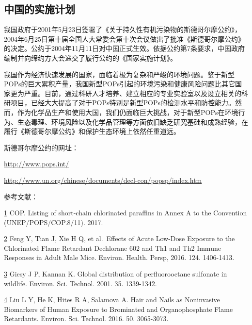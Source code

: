 \documentclass[]{book}
\begin{document}
\hypertarget{ux4e2dux56fdux7684ux5b9eux65bdux8ba1ux5212}{%
\subsection{中国的实施计划}\label{ux4e2dux56fdux7684ux5b9eux65bdux8ba1ux5212}}

我国政府于2001年5月23日签署了《关于持久性有机污染物的斯德哥尔摩公约》，2004年6月25日第十届全国人大常委会第十次会议做出了批准《斯德哥尔摩公约》的决定。公约于2004年11月11日对中国正式生效。依据公约第7条要求，中国政府编制并向缔约方大会递交了履行公约的《国家实施计划》。

我国作为经济快速发展的国家，面临着极为复杂和严峻的环境问题。鉴于新型POPs的巨大累积产量，我国新型POPs引起的环境污染和健康风险问题比其它国家更为严重。目前，通过科研人才培养、建立相应的专业实验室以及设立相关的科研项目，已经大大提高了对于POPs特别是新型POPs的检测水平和防控能力。然而，作为化学品生产和使用大国，我们仍面临巨大挑战，对于新型POPs在环境行为、生态毒理、环境风险以及化学品管理等方面依旧缺乏研究基础和成熟经验，在履行《斯德哥尔摩公约》和保护生态环境上依然任重道远。

斯德哥尔摩公约的网址：

\url{http://www.pops.int/}

\url{http://www.un.org/chinese/documents/decl-con/popsp/index.htm}

参考文献：

\href{陈心想，耿增超。西北农林科技大学学报（自然科学版），2013，41:\%20167-174．}{1} COP. Listing of short-chain chlorinated paraffins in Annex A to the Convention (UNEP/POPS/COP.8/11). 2017.

\href{Kezhen\%20Qian,\%20Ajay\%20Kumar,\%20et.al.\%20Renew.\%20and\%20Sustain.\%20Energy\%20Reviews,\%202015,\%2042:\%201055-1064.}{2} Feng Y, Tian J, Xie H Q, et al.~Effects of Acute Low-Dose Exposure to the Chlorinated Flame Retardant Dechlorane 602 and Th1 and Th2 Immune Responses in Adult Male Mice. Environ. Health. Persp, 2016. 124. 1406-1413.

\href{Puga\%20A\%20P,\%20Abreu\%20C\%20A,\%20et\%20al.\%20J.\%20of\%20Environ.\%20Manage.,\%202015,\%20159:\%2086–93.}{3} Giesy J P, Kannan K. Global distribution of perfluorooctane sulfonate in wildlife. Environ. Sci. Technol. 2001. 35. 1339-1342.

\href{Khan\%20S,\%20Cai\%20Chao,\%20et\%20al．\%20Environ.\%20Sci.\%20\&\%20Technol.,\%202013,\%2047\%20:\%208624-8632．}{4} Liu L Y, He K, Hites R A, Salamova A. Hair and Nails as Noninvasive Biomarkers of Human Exposure to Brominated and Organophosphate Flame Retardants. Environ. Sci. Technol. 2016. 50. 3065-3073.
\end{document}
